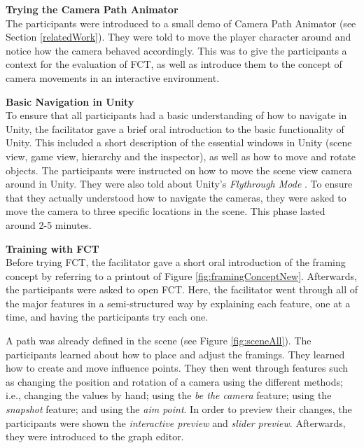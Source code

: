 \textbf{Trying the Camera Path Animator}\\
The participants were introduced to a small demo of Camera Path Animator \cite{unity_camTool} (see Section \ref{relatedWork}). They were told to move the player character around and notice how the camera behaved accordingly. This was to give the participants a context for the evaluation of FCT, as well as introduce them to the concept of camera movements in an interactive environment.




\textbf{Basic Navigation in Unity}\\
To ensure that all participants had a basic understanding of how to navigate in Unity, the facilitator gave a brief oral introduction to the basic functionality of Unity. This included a short description of the essential windows in Unity (scene view, game view, hierarchy and the inspector), as well as how to move and rotate objects. The participants were instructed on how to move the scene view camera around in Unity. They were also told about Unity's \textit{Flythrough Mode} \cite{unity_flyMode}. To ensure that they actually understood how to navigate the cameras, they were asked to move the camera to three specific locations in the scene. This phase lasted around 2-5 minutes.


\textbf{Training with FCT}\\
Before trying FCT, the facilitator gave a short oral introduction of the framing concept by referring to a printout of Figure \ref{fig:framingConceptNew}. Afterwards, the participants were asked to open FCT. Here, the facilitator went through all of the major features in a semi-structured way by explaining each feature, one at a time, and having the participants try each one.

A path was already defined in the scene (see Figure \ref{fig:sceneAll}). The participants learned about how to place and adjust the framings. They learned how to create and move influence points. They then went through features such as changing the position and rotation of a camera using the different methods; i.e., changing the values by hand; using the \textit{be the camera} feature; using the \textit{snapshot} feature; and using the \textit{aim point}. In order to preview their changes, the participants were shown the \textit{interactive preview} and \textit{slider preview}. Afterwards, they were introduced to the graph editor.


